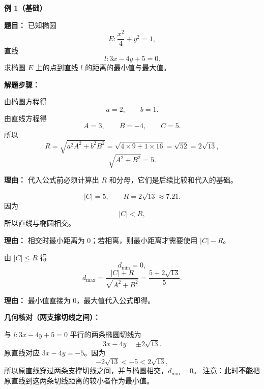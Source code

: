 \begin{examplebox}
	\textbf{\textcolor{CExample}{例 1（基础）}}

	\textbf{\textcolor{CExample}{题目：}}
	已知椭圆
	\[
		E:\frac{x^2}{4}+y^2=1,
	\]
	直线
	\[
		l:3x-4y+5=0.
	\]
	求椭圆 \(E\) 上的点到直线 \(l\) 的距离的最小值与最大值。

	\textbf{\textcolor{CExample}{解题步骤：}}

	\begin{description}[style=nextline, leftmargin=2.8em, labelsep=0.5em, itemsep=0.45em]
		\item[\textbf{第一步（计算基本量）：}]
		      由椭圆方程得
		      \[
			      a=2,\qquad b=1.
		      \]
		      由直线方程得
		      \[
			      A=3,\qquad B=-4,\qquad C=5.
		      \]
		      所以
		      \[
			      R=\sqrt{a^2A^2+b^2B^2}
			      =
			      \sqrt{4\times 9+1\times 16}
			      =
			      \sqrt{52}
			      =
			      2\sqrt{13},
		      \]
		      \[
			      \sqrt{A^2+B^2}=5.
		      \]

		      \par\textbf{理由：}
		      代入公式前必须计算出 \(R\) 和分母，它们是后续比较和代入的基础。

		\item[\textbf{第二步（比较 \(|C|\) 与 \(R\)：}]
		      \[
			      |C|=5,
			      \qquad
			      R=2\sqrt{13}\approx 7.21.
		      \]
		      因为
		      \[
			      |C|<R,
		      \]
		      所以直线与椭圆相交。

		      \par\textbf{理由：}
		      相交时最小距离为 \(0\)；若相离，则最小距离才需要使用 \(|C|-R\)。

		\item[\textbf{第三步（套用最值公式）：}]
		      由 \(|C|\le R\) 得
		      \[
			      d_{\min}=0,
		      \]
		      \[
			      d_{\max}
			      =
			      \frac{|C|+R}{\sqrt{A^2+B^2}}
			      =
			      \frac{5+2\sqrt{13}}{5}.
		      \]

		      \par\textbf{理由：}
		      最小值直接为 \(0\)，最大值代入公式即得。
	\end{description}

	\textbf{\textcolor{CExample}{几何核对（两支撑切线之间）：}}

	与 \(l:3x-4y+5=0\) 平行的两条椭圆切线为
	\[
		3x-4y=\pm2\sqrt{13}.
	\]
	原直线对应 \(3x-4y=-5\)。因为
	\[
		-2\sqrt{13}<-5<2\sqrt{13},
	\]
	所以原直线穿过两条支撑切线之间，并与椭圆相交，\(d_{\min}=0\)。
	注意：此时\textbf{不能}把原直线到这两条切线距离的较小者作为最小值。


\end{examplebox}
